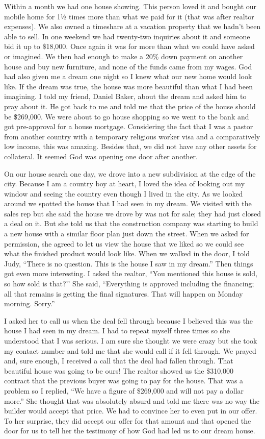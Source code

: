 \documentclass[oneside]{book}
\begin{document}
Within a month we had one house showing. This person loved it and bought our mobile home for 1½ times more than what we paid for it (that was after realtor expenses). We also owned a timeshare at a vacation property that we hadn’t been able to sell. In one weekend we had twenty-two inquiries about it and someone bid it up to \$18,000. Once again it was for more than what we could have asked or imagined. We then had enough to make a 20\% down payment on another house and buy new furniture, and none of the funds came from my wages. God had also given me a dream one night so I knew what our new home would look like. If the dream was true, the house was more beautiful than what I had been imagining. I told my friend, Daniel Baker, about the dream and asked him to pray about it. He got back to me and told me that the price of the house should be \$269,000. We were about to go house shopping so we went to the bank and got pre-approval for a house mortgage. Considering the fact that I was a pastor from another country with a temporary religious worker visa and a comparatively low income, this was amazing. Besides that, we did not have any other assets for collateral. It seemed God was opening one door after another.

On our house search one day, we drove into a new subdivision at the edge of the city. Because I am a country boy at heart, I loved the idea of looking out my window and seeing the country even though I lived in the city. As we looked around we spotted the house that I had seen in my dream. We visited with the sales rep but she said the house we drove by was not for sale; they had just closed a deal on it. But she told us that the construction company was starting to build a new house with a similar floor plan just down the street. When we asked for permission, she agreed to let us view the house that we liked so we could see what the finished product would look like. When we walked in the door, I told Judy, “There is no question. This is the house I saw in my dream.” Then things got even more interesting. I asked the realtor, “You mentioned this house is sold, so how sold is that?’’ She said, “Everything is approved including the financing; all that remains is getting the final signatures. That will happen on Monday morning. Sorry.” 

I asked her to call us when the deal fell through because I believed this was the house I had seen in my dream. I had to repeat myself three times so she understood that I was serious. I am sure she thought we were crazy but she took my contact number and told me that she would call if it fell through. We prayed and, sure enough, I received a call that the deal had fallen through. That beautiful house was going to be ours! The realtor showed us the \$310,000 contract that the previous buyer was going to pay for the house. That was a problem so I replied, “We have a figure of \$269,000 and will not pay a dollar more.” She thought that was absolutely absurd and told me there was no way the builder would accept that price. We had to convince her to even put in our offer. To her surprise, they did accept our offer for that amount and that opened the door for us to tell her the testimony of how God had led us to our dream house.
\end{document}

